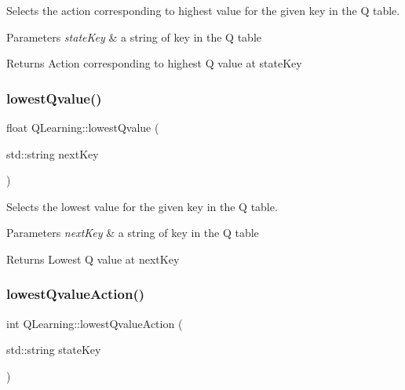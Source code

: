 Selects the action corresponding to highest value for the given key in the Q table. 


\begin{DoxyParams}{Parameters}
{\em state\+Key} & a string of key in the Q table \\
\hline
\end{DoxyParams}
\begin{DoxyReturn}{Returns}
Action corresponding to highest Q value at state\+Key 
\end{DoxyReturn}
\mbox{\label{classQLearning_a2ec75be948cae6812f4b752d58cd94c4}} 
\subsubsection{\texorpdfstring{lowest\+Qvalue()}{lowestQvalue()}}
{\footnotesize\ttfamily float Q\+Learning\+::lowest\+Qvalue (\begin{DoxyParamCaption}\item[{std\+::string}]{next\+Key }\end{DoxyParamCaption})}



Selects the lowest value for the given key in the Q table. 


\begin{DoxyParams}{Parameters}
{\em next\+Key} & a string of key in the Q table \\
\hline
\end{DoxyParams}
\begin{DoxyReturn}{Returns}
Lowest Q value at next\+Key 
\end{DoxyReturn}
\mbox{\label{classQLearning_a53aefdab5c6376dc6bc14da2a4d65c4e}} 
\subsubsection{\texorpdfstring{lowest\+Qvalue\+Action()}{lowestQvalueAction()}}
{\footnotesize\ttfamily int Q\+Learning\+::lowest\+Qvalue\+Action (\begin{DoxyParamCaption}\item[{std\+::string}]{state\+Key }\end{DoxyParamCaption})}




